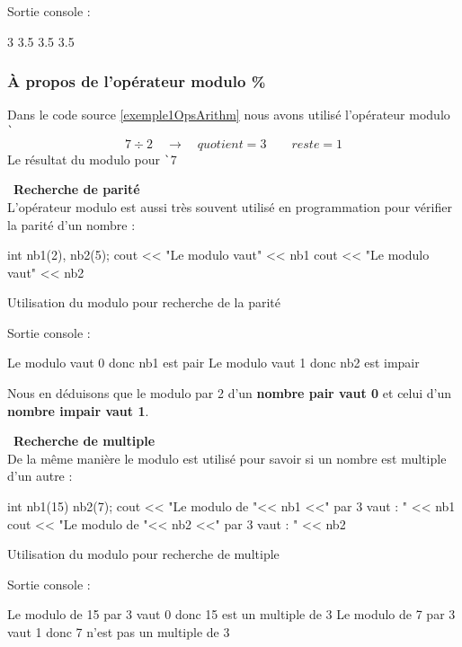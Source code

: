 \documentclass[10pt]{article}
\begin{document}
\bigskip
Sortie console :
\begin{textcode}
    3
    3.5
    3.5
    3.5
\end{textcode}


\subsubsection{À propos de l'opérateur modulo \%}
Dans le code source \ref{exemple1OpsArithm} nous avons utilisé l'opérateur modulo \texttt`%
$$7\div2 \quad\rightarrow\quad quotient=3 \qquad reste =1$$
Le résultat du modulo pour \texttt`7%

\bigskip
\faCaretRight\ \textbf{Recherche de parité}\\
L'opérateur modulo est aussi très souvent utilisé en programmation pour vérifier la parité d'un nombre :
\begin{cppcode}
    int nb1(2), nb2(5);
    cout << "Le modulo vaut" << nb1%
    cout << "Le modulo vaut" << nb2%
\end{cppcode}
\caption{Utilisation du modulo pour recherche de la parité}

\bigskip
Sortie console :
\begin{textcode}
    Le modulo vaut 0 donc nb1 est pair
    Le modulo vaut 1 donc nb2 est impair
\end{textcode}

Nous en déduisons que le modulo par 2 d'un \textbf{nombre pair vaut 0} et celui d'un \textbf{nombre impair vaut 1}.

\bigskip
\faCaretRight\ \textbf{Recherche de multiple}\\
De la même manière le modulo est utilisé pour savoir si un nombre est multiple d'un autre :
\begin{cppcode}
    int nb1(15) nb2(7);
    cout << "Le modulo de "<< nb1 <<" par 3 vaut : " << nb1%
    cout << "Le modulo de "<< nb2 <<" par 3 vaut : " << nb2%
\end{cppcode}
\caption{Utilisation du modulo pour recherche de multiple}

\bigskip
Sortie console :
\begin{textcode}
    Le modulo de 15 par 3 vaut 0 donc 15 est un multiple de 3
    Le modulo de 7 par 3 vaut 1 donc 7 n'est pas un multiple de 3
\end{textcode}
\end{document}
